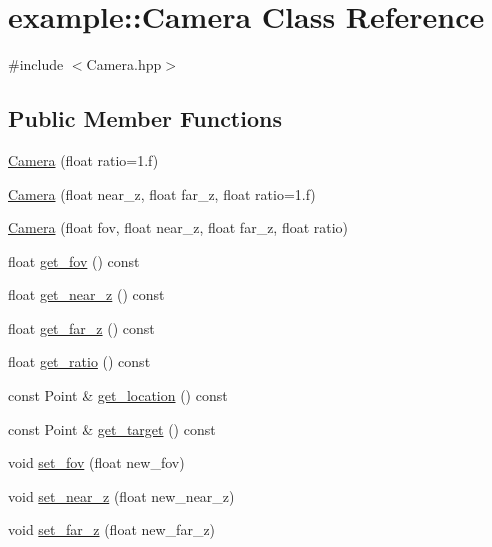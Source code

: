 \hypertarget{classexample_1_1_camera}{}\section{example\+:\+:Camera Class Reference}
\label{classexample_1_1_camera}


{\ttfamily \#include $<$Camera.\+hpp$>$}

\subsection*{Public Member Functions}
\begin{DoxyCompactItemize}
\item 
\mbox{\hyperlink{classexample_1_1_camera_af7baaae5fda716b71356ce0d36cb5856}{Camera}} (float ratio=1.f)
\item 
\mbox{\hyperlink{classexample_1_1_camera_ae9996fd414d9ea3b212d10fc736d08e4}{Camera}} (float near\+\_\+z, float far\+\_\+z, float ratio=1.f)
\item 
\mbox{\hyperlink{classexample_1_1_camera_af7f8bfa29635307a57c5abe94225a3c6}{Camera}} (float fov, float near\+\_\+z, float far\+\_\+z, float ratio)
\item 
float \mbox{\hyperlink{classexample_1_1_camera_a036d3963a777f5ba79dc71d8809dfa2d}{get\+\_\+fov}} () const
\item 
float \mbox{\hyperlink{classexample_1_1_camera_ae61da628123c5b4c6f37913c2f640604}{get\+\_\+near\+\_\+z}} () const
\item 
float \mbox{\hyperlink{classexample_1_1_camera_a9bdb46b1257a2fc4dc57ccdf83e2b2f7}{get\+\_\+far\+\_\+z}} () const
\item 
float \mbox{\hyperlink{classexample_1_1_camera_a422ce687afdc941ca49fe54527bcd424}{get\+\_\+ratio}} () const
\item 
const Point \& \mbox{\hyperlink{classexample_1_1_camera_a50cd7e64453f10fb278c399cac6dfc21}{get\+\_\+location}} () const
\item 
const Point \& \mbox{\hyperlink{classexample_1_1_camera_a559bad945679ef774c9979e45880c9dc}{get\+\_\+target}} () const
\item 
void \mbox{\hyperlink{classexample_1_1_camera_abd6281e8951e0080e41823e804f55bb5}{set\+\_\+fov}} (float new\+\_\+fov)
\item 
void \mbox{\hyperlink{classexample_1_1_camera_af112b80e00c374d3c2dd74d776222234}{set\+\_\+near\+\_\+z}} (float new\+\_\+near\+\_\+z)
\item 
void \mbox{\hyperlink{classexample_1_1_camera_a3121b4ab410738a97cb36ea37bb38a65}{set\+\_\+far\+\_\+z}} (float new\+\_\+far\+\_\+z)

\end{DoxyCompactItemize}
